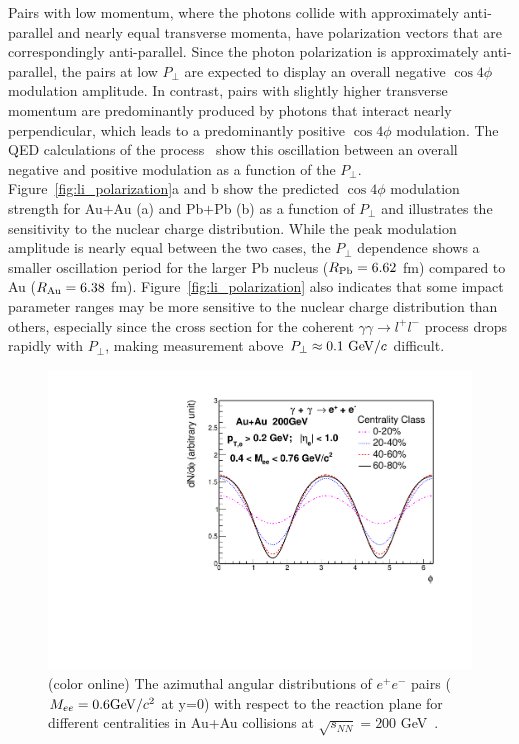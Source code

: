 \documentclass[twocolumn,epjc3]{svjour3}\sloppy
\begin{document}
Pairs with low momentum, where the photons collide with approximately anti-parallel and nearly equal transverse momenta, have polarization vectors that are correspondingly anti-parallel. Since the photon polarization is approximately anti-parallel, the pairs at low $P_\perp$ are expected to display an overall negative $\cos4\phi$ modulation amplitude.
In contrast, pairs with slightly higher transverse momentum are predominantly produced by photons that interact nearly perpendicular, which leads to a predominantly positive $\cos4\phi$ modulation. The QED calculations of the process~\cite{liImpactParameterDependence2020} show this oscillation between an overall negative and positive modulation as a function of the $P_\perp$. Figure~\ref{fig:li_polarization}a and b show the predicted $\cos4\phi$ modulation strength for Au$+$Au (a) and Pb$+$Pb (b) as a function of $P_\perp$ and illustrates the sensitivity to the nuclear charge distribution. 
While the peak modulation amplitude is nearly equal between the two cases, the $P_\perp$ dependence shows a smaller oscillation period for the larger Pb nucleus ($R_{\rm Pb} = 6.62$ fm) compared to Au ($R_{\rm Au} = 6.38$ fm). 
Figure~\ref{fig:li_polarization} also indicates that some impact parameter ranges may be more sensitive to the nuclear charge distribution than others, especially since the cross section for the coherent $\gamma\gamma \rightarrow l^+l^-$ process drops rapidly with $P_\perp$, making measurement above $P_\perp\approx 0.1 {\rm\ GeV}/c$ difficult.


\begin{figure}
    \centering
    \includegraphics[width=.99\linewidth]{fig/drawphidis_b.pdf}
    \caption{(color online) 
    The azimuthal angular distributions of $e^+e^-$ pairs ($M_{ee}=0.6 {\rm GeV}/c^2$ at y=0) with respect to the reaction plane for different centralities in Au+Au collisions at $\sqrt{s_{NN}} = 200 $ GeV~\cite{zhaInitialTransversemomentumBroadening2020b}. 
  }
  \label{fig:future}
\end{figure}
\end{document}
